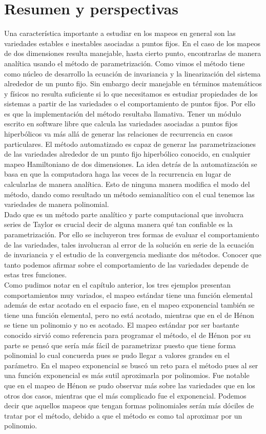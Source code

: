 
\chapter{Resumen y perspectivas}
Una característica importante a estudiar en los mapeos en general son las variedades estables e inestables asociadas a puntos fijos. En el caso de los mapeos de dos dimensiones resulta manejable, hasta cierto punto, encontrarlas de manera analítica usando el método de parametrización. Como vimos el método tiene como núcleo de desarrollo la ecuación de invariancia y la linearización del sistema alrededor de un punto fijo. Sin embargo decir manejable en términos matemáticos y físicos no resulta suficiente si lo que necesitamos es estudiar propiedades de los sistemas a partir de las variedades o el comportamiento de puntos fijos. Por ello es que la implementación del método resultaba llamativa. Tener un módulo escrito en software libre que calcula las variedades asociadas a puntos fijos hiperbólicos va más allá de generar las relaciones de recurrencia en casos particulares. El método automatizado es capaz de generar las parametrizaciones de las variedades alrededor de un punto fijo hiperbólico conocido, en cualquier mapeo Hamiltoniano de dos dimensiones. La idea detrás de la automatización se basa en que la computadora haga las veces de la recurrencia en lugar de calcularlas de manera analítica. Esto de ninguna manera modifica el modo del método, dando como resultado un método semianalítico con el cual tenemos las variedades de manera polinomial. \\

Dado que es un método parte analítico y parte computacional que involucra series de Taylor es crucial decir de alguna manera qué tan confiable es la parametrización. Por ello se incluyeron tres formas de evaluar el comportamiento de las variedades, tales involucran al error de la solución en serie de la ecuación de invariancia y el estudio de la convergencia mediante dos métodos. Conocer que tanto podemos afirmar sobre el comportamiento de las variedades depende de estas tres funciones.\\

Como pudimos notar en el capítulo anterior, los tres ejemplos presentan comportamientos muy variados, el mapeo estándar tiene una función elemental además de estar acotado en el espacio fase, en el mapeo exponencial también se tiene una función elemental, pero no está acotado, mientras que en el de Hénon se tiene un polinomio y no es acotado. El mapeo estándar por ser bastante conocido sirvió como referencia para programar el método, el de Hénon por su parte se pensó que sería más fácil de parametrizar puesto que tiene forma polinomial lo cual concuerda pues se pudo llegar a valores grandes en el parámetro. En el mapeo exponencial se buscó un reto para el método pues al ser una función exponencial es más sutil aproximarla por polinomios. Fue notable que en el mapeo de Hénon se pudo observar más sobre las variedades que en los otros dos casos, mientras que el más complicado fue el exponencial. Podemos decir que aquellos mapeos que tengan formas polinomiales serán más dóciles de tratar por el método, debido a que el método es como tal aproximar por un polinomio.\\

